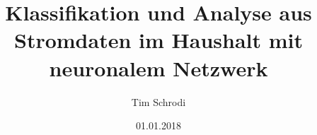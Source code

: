 \documentclass[12pt, a4paper]{report}
\begin{document}
\title{Klassifikation und Analyse aus Stromdaten im Haushalt mit neuronalem
Netzwerk}
\author{Tim Schrodi}
\date{01.01.2018}
\maketitle

\tableofcontents












{}

\end{document}
